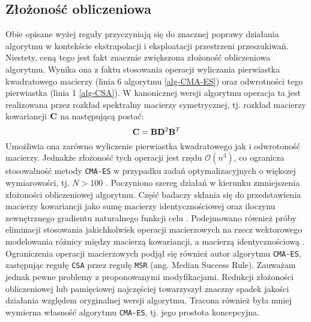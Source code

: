\subsection{Złożoność obliczeniowa}
  Obie opisane wyżej reguły przyczyniają się do znacznej poprawy działania algorytmu w kontekście ekstrapolacji i eksploatacji przestrzeni przeszukiwań. Niestety, ceną tego jest fakt znacznie zwiększona złożoność obliczeniowa algorytmu. Wynika ona z faktu stosowania operacji wyliczania pierwiastka kwadratowego macierzy (linia 6 algorytmu \ref{alg-CMA-ES}) oraz odwrotności tego pierwiastka (linia 1 \ref{alg-CSA}).
  W kanonicznej wersji algorytmu operacja ta jest realizowana przez rozkład spektralny macierzy symetrycznej, tj. rozkład macierzy kowariancji ${\bf C}$ na następującą postać:
  \begin{equation}
    {\bf C} = {\bf B}{\bf D}^{2}{\bf B}^{T}
  \end{equation}
  Umożliwia ona zarówno wyliczenie pierwiastka kwadratowego jak i odwrotoność macierzy. Jednakże złożoność tych operacji jest rzędu $\mathcal{O}(n^3)$, co ogranicza stosowalność metody \texttt{CMA-ES} w przypadku zadań optymalizacyjnych o większej wymiarowości, tj. $N > 100$ \cite{cma-es-tutorial}.
  Poczyniono szereg działań w kierunku zmniejszenia złożoności obliczeniowej algorytmu. Część badaczy skłania się do przedstawienia macierzy kowariancji jako sumę macierzy identycznościowej oraz iloczynu zewnętrznego gradientu naturalnego funkcji celu \cite{nes-es}. Podejmowano również próby eliminacji stosowania jakichkolwiek operacji macierzowych na rzecz wektorowego modelowania różnicy między macierzą kowariancji, a macierzą identycznościową \cite{lm-cma-es}.
  Ograniczenia operacji macierzowych podjął się również autor algorytmu \texttt{CMA-ES}, zastępując regułę \texttt{CSA} przez regułę \texttt{MSR} (ang. Median Success Rule).
  Zauważam jednak pewne problemy z proponowanymi modyfikacjami. Redukcji złożoności obliczeniowej lub pamięciowej najczęściej towarzyszył znaczny spadek jakości działania względem oryginalnej wersji algorytmu. Tracona również była mniej wymierna własność algorytmu \texttt{CMA-ES}, tj. jego prostota koncepcyjna. 

